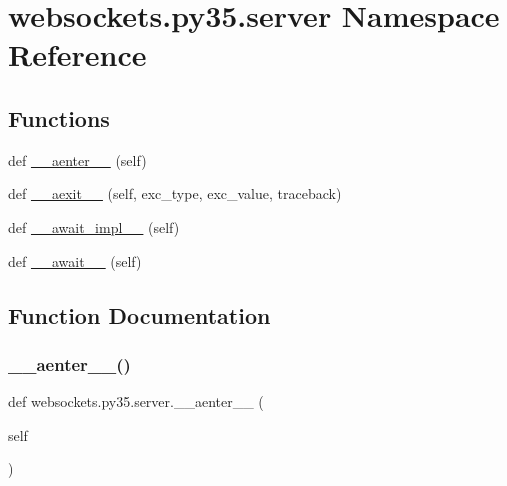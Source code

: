 \hypertarget{namespacewebsockets_1_1py35_1_1server}{}\section{websockets.\+py35.\+server Namespace Reference}
\label{namespacewebsockets_1_1py35_1_1server}
\subsection*{Functions}
\begin{DoxyCompactItemize}
\item 
def \hyperlink{namespacewebsockets_1_1py35_1_1server_af3ec745b50511831ff771a2ccf598ef3}{\+\_\+\+\_\+aenter\+\_\+\+\_\+} (self)
\item 
def \hyperlink{namespacewebsockets_1_1py35_1_1server_a9474f031cf39ab396ccadc159548f987}{\+\_\+\+\_\+aexit\+\_\+\+\_\+} (self, exc\+\_\+type, exc\+\_\+value, traceback)
\item 
def \hyperlink{namespacewebsockets_1_1py35_1_1server_a19d06ddfa27bbb3f80eb86d1f171da91}{\+\_\+\+\_\+await\+\_\+impl\+\_\+\+\_\+} (self)
\item 
def \hyperlink{namespacewebsockets_1_1py35_1_1server_af97a5338c2908f375038dc5d0a507e79}{\+\_\+\+\_\+await\+\_\+\+\_\+} (self)
\end{DoxyCompactItemize}


\subsection{Function Documentation}
\mbox{\label{namespacewebsockets_1_1py35_1_1server_af3ec745b50511831ff771a2ccf598ef3}} 
\subsubsection{\texorpdfstring{\+\_\+\+\_\+aenter\+\_\+\+\_\+()}{\_\_aenter\_\_()}}
{\footnotesize\ttfamily def websockets.\+py35.\+server.\+\_\+\+\_\+aenter\+\_\+\+\_\+ (\begin{DoxyParamCaption}\item[{}]{self }\end{DoxyParamCaption})}

